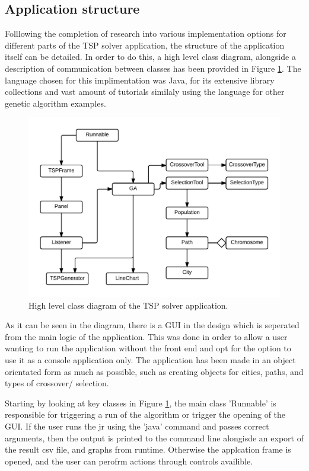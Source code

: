 \documentclass[article]{IEEEtran}
\begin{document}
\subsection{Application structure}
Folllowing the completion of research into various implementation options for different parts of the TSP solver application, the structure of the application itself can be detailed. In order to do this, a high level class diagram, alongside a description of communication between classes has been provided in Figure \ref{fig:5}. The language chosen for this implimentation was Java, for its extensive library collections and vast amount of tutorials similaly using the language for other genetic algorithm examples.
\begin{figure}[H]
\centering
  \includegraphics[width=.8\linewidth]{images/class}
  \caption{High level class diagram of the TSP solver application.}
  \label{fig:5}
\end{figure}
As it can be seen in the diagram, there is a GUI in the design which is seperated from the main logic of the application. This was done in order to allow a user wanting to run the application without the front end and opt for the option to use it as a console application only. The application has been made in an object orientated form as much as possible, such as creating objects for cities, paths, and types of crossover/ selection. \par
Starting by looking at key classes in Figure \ref{fig:5}, the main class 'Runnable' is responsible for triggering a run of the algorithm or trigger the opening of the GUI. If the user runs the jr using the 'java' command and passes correct arguments, then the output is printed to the command line alongisde an export of the result csv file, and graphs from runtime. Otherwise the applcation frame is opened, and the user can perofrm actions through controls availible. \par
\end{document}
